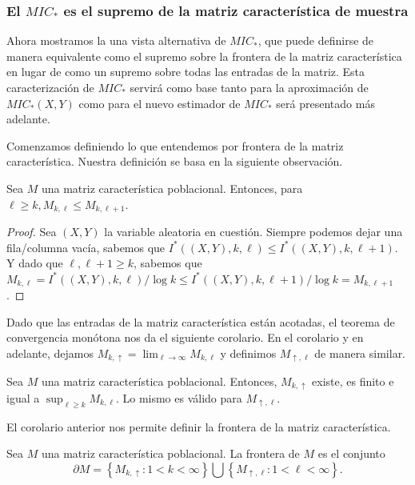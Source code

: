         \subsubsection[El MIC star es el supremo de la matriz caracteristica de muestra]{El $MIC_*$ es el supremo de la matriz caracter\'istica de muestra}
    
        Ahora mostramos la una vista alternativa de $MIC_*$, que puede definirse de manera equivalente como el supremo sobre la frontera de la matriz caracter\'istica en lugar de como un supremo sobre todas las entradas de la matriz. Esta caracterizaci\'on de $MIC_*$ servir\'a como base tanto para la aproximaci\'on de $MIC_*(X, Y)$ como para el nuevo estimador de $MIC_*$ ser\'a presentado m\'as adelante.
    
        Comenzamos definiendo lo que entendemos por frontera de la matriz caracter\'istica. Nuestra definici\'on se basa en la siguiente observaci\'on.
        \begin{prop}
            Sea $M$ una matriz caracter\'istica poblacional. Entonces, para $\ell \geq k, M_{k, \ell} \leq M_{k, \ell+1}$.
        \end{prop}
        \begin{proof}
            Sea $(X, Y)$ la variable aleatoria en cuesti\'on. Siempre podemos dejar una fila/columna vac\'ia, sabemos que $I^*((X, Y), k, \ell) \leq I^*((X, Y), k, \ell+1)$. Y dado que $\ell, \ell+1 \geq k$, sabemos que $M_{k, \ell}=I^*((X, Y), k, \ell) / \log k \leq I^*((X, Y), k, \ell+1) / \log k=M_{k, \ell+1}$.
        \end{proof}
    
        Dado que las entradas de la matriz caracter\'istica est\'an acotadas, el teorema de convergencia mon\'otona nos da el siguiente corolario. En el corolario y en adelante, dejamos $M_{k, \uparrow}=\lim _{\ell \rightarrow \infty} M_{k, \ell}$ y definimos $M_{\uparrow, \ell}$ de manera similar.

        \begin{cor}
            Sea $M$ una matriz caracter\'istica poblacional. Entonces, $M_{k, \uparrow}$ existe, es finito e igual a $\sup _{\ell \geq k} M_{k, \ell}$. Lo mismo es v\'alido para $M_{\uparrow, \ell}$. \label{cor:frontera}
        \end{cor}
    
        El corolario anterior nos permite definir la frontera de la matriz caracter\'istica.
    
        \begin{defn}
            Sea $M$ una matriz caracter\'istica poblacional. La frontera de $M$ es el conjunto
            $$
            \partial M=\left\{M_{k, \uparrow}: 1<k<\infty\right\} \bigcup\left\{M_{\uparrow, \ell}: 1<\ell<\infty\right\}.
            $$
        \end{defn}
        
